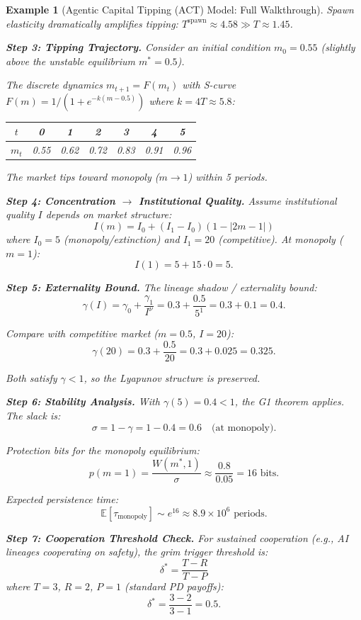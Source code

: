 \documentclass[12pt]{article}
\newtheorem{example}[theorem]{Example}
\newcommand{\E}{\mathbb{E}}
\begin{document}
\begin{example}[Agentic Capital Tipping (ACT) Model: Full Walkthrough]
Spawn elasticity dramatically amplifies tipping: $T^{\text{spawn}} \approx 4.58 \gg T \approx 1.45$.

\textbf{Step 3: Tipping Trajectory.}
Consider an initial condition $m_0 = 0.55$ (slightly above the unstable equilibrium $m^* = 0.5$).

The discrete dynamics $m_{t+1} = F(m_t)$ with S-curve $F(m) = 1/(1 + e^{-k(m - 0.5)})$ where $k = 4T \approx 5.8$:

\begin{center}
\begin{tabular}{c|cccccc}
$t$ & 0 & 1 & 2 & 3 & 4 & 5 \\
\hline
$m_t$ & 0.55 & 0.62 & 0.72 & 0.83 & 0.91 & 0.96 \\
\end{tabular}
\end{center}

The market tips toward monopoly ($m \to 1$) within 5 periods.

\textbf{Step 4: Concentration $\to$ Institutional Quality.}
Assume institutional quality $I$ depends on market structure:
\[
I(m) = I_0 + (I_1 - I_0)(1 - |2m - 1|)
\]
where $I_0 = 5$ (monopoly/extinction) and $I_1 = 20$ (competitive). At monopoly ($m = 1$):
\[
I(1) = 5 + 15 \cdot 0 = 5.
\]

\textbf{Step 5: Externality Bound.}
The lineage shadow / externality bound:
\[
\gamma(I) = \gamma_0 + \frac{\gamma_1}{I^\nu} = 0.3 + \frac{0.5}{5^1} = 0.3 + 0.1 = 0.4.
\]

Compare with competitive market ($m = 0.5$, $I = 20$):
\[
\gamma(20) = 0.3 + \frac{0.5}{20} = 0.3 + 0.025 = 0.325.
\]

Both satisfy $\gamma < 1$, so the Lyapunov structure is preserved.

\textbf{Step 6: Stability Analysis.}
With $\gamma(5) = 0.4 < 1$, the G1 theorem applies. The slack is:
\[
\sigma = 1 - \gamma = 1 - 0.4 = 0.6 \quad \text{(at monopoly)}.
\]

Protection bits for the monopoly equilibrium:
\[
p(m = 1) = \frac{W(m^*, 1)}{\sigma} \approx \frac{0.8}{0.05} = 16 \text{ bits}.
\]

Expected persistence time:
\[
\E[\tau_{\text{monopoly}}] \sim e^{16} \approx 8.9 \times 10^6 \text{ periods}.
\]

\textbf{Step 7: Cooperation Threshold Check.}
For sustained cooperation (e.g., AI lineages cooperating on safety), the grim trigger threshold is:
\[
\delta^* = \frac{T - R}{T - P}
\]
where $T = 3$, $R = 2$, $P = 1$ (standard PD payoffs):
\[
\delta^* = \frac{3 - 2}{3 - 1} = 0.5.
\]


\end{example}
\end{document}
